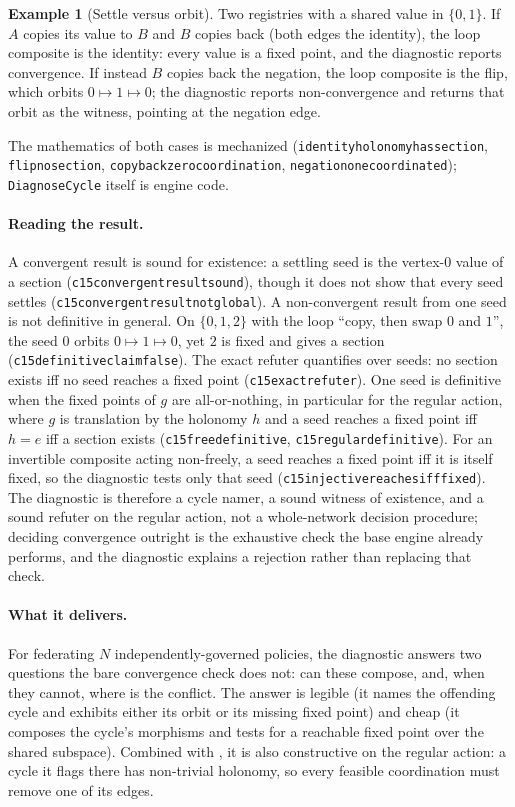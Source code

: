 \documentclass[11pt,a4paper]{article}
\theoremstyle{plain}
\theoremstyle{definition}
\newtheorem{example}[theorem]{Example}
\theoremstyle{remark}
\renewcommand{\_}{\origunderscore\allowbreak}
\begin{document}
\begin{example}[Settle versus orbit]
\label{ex:diag}
Two registries with a shared value in $\{0,1\}$. If $A$ copies its value to $B$ and $B$ copies back
(both edges the identity), the loop composite is the identity: every value is a fixed point, and the
diagnostic reports convergence. If instead $B$ copies back the negation, the loop composite is the
flip, which orbits $0 \mapsto 1 \mapsto 0$; the diagnostic reports non-convergence and returns that
orbit as the witness, pointing at the negation edge.
\end{example}
\noindent The mathematics of both cases is mechanized (\texttt{identity\_holonomy\_has\_section},
\texttt{flip\_no\_section}, \texttt{copyback\_zero\_coordination},
\texttt{negation\_one\_coordinated}); \texttt{DiagnoseCycle} itself is engine code.

\paragraph{Reading the result.} A convergent result is sound for existence: a settling seed is the
vertex-$0$ value of a section (\texttt{c15\_convergent\_result\_sound}), though it does not show that
every seed settles (\texttt{c15\_convergent\_result\_not\_global}). A non-convergent result from one
seed is not definitive in general. On $\{0,1,2\}$ with the loop ``copy, then swap $0$ and $1$'', the
seed $0$ orbits $0 \mapsto 1 \mapsto 0$, yet $2$ is fixed and gives a section
(\texttt{c15\_definitive\_claim\_false}). The exact refuter quantifies over seeds: no section exists
iff no seed reaches a fixed point (\texttt{c15\_exact\_refuter}). One seed is definitive when the
fixed points of $g$ are all-or-nothing, in particular for the regular action, where $g$ is translation
by the holonomy $h$ and a seed reaches a fixed point iff $h = e$ iff a section exists
(\texttt{c15\_free\_definitive}, \texttt{c15\_regular\_definitive}). For an invertible composite
acting non-freely, a seed reaches a fixed point iff it is itself fixed, so the diagnostic tests only
that seed (\texttt{c15\_injective\_reaches\_iff\_fixed}). The diagnostic is therefore a cycle namer,
a sound witness of existence, and a sound refuter on the regular action, not a whole-network decision
procedure; deciding convergence outright is the exhaustive check the base engine already performs,
and the diagnostic explains a rejection rather than replacing that check.

\paragraph{What it delivers.} For federating $N$ independently-governed policies, the diagnostic
answers two questions the bare convergence check does not: can these compose, and, when they
cannot, where is the conflict. The answer is legible (it names the offending cycle and exhibits
either its orbit or its missing fixed point) and cheap (it composes the cycle's morphisms and tests
for a reachable fixed point over the shared subspace). Combined with , it is also
constructive on the regular action: a cycle it flags there has non-trivial holonomy, so every feasible
coordination must remove one of its edges.
\end{document}
